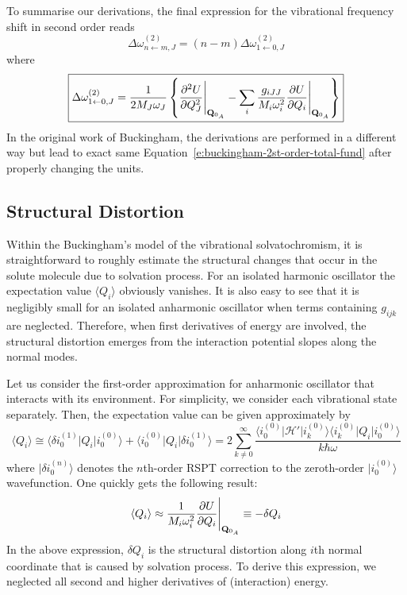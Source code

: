 \documentclass[b5paper,oneside,fleqn,11pt]{book}
\begin{document}
\begin{refsection}
To summarise our derivations, the final expression for the vibrational frequency shift in 
second order reads
%
\begin{equation}  \label{e:buckingham-2st-order-total}
\boxed{
\Delta \omega_{n\leftarrow m,J}^{(2)} = \left( n-m \right) \Delta \omega_{1\leftarrow 0,J}^{(2)}
}
\end{equation}
%
where
%
\begin{equation}  \label{e:buckingham-2st-order-total-fund}
\boxed{
\Delta \omega_{1\leftarrow 0,J}^{(2)} = 
\frac{1}{2M_J\omega_J} 
\left\{
\frac{\partial^2 U}{\partial Q_J^2} \Bigg|_{{\bf Q}_{0_A}} 
%
- \sum_{i} \frac{g_{iJJ}}{M_i\omega_i^2} 
\frac{\partial U}{\partial Q_i} \Bigg|_{{\bf Q}_{0_A}}
\right\}
}
\end{equation}
%
In the original work of Buckingham, the derivations are performed in a different way
but lead to exact same Equation~\eqref{e:buckingham-2st-order-total-fund} 
after properly changing the units.

\subsection{Structural Distortion\label{s:structural-distortion-buckingham}}

Within the Buckingham's model of the vibrational solvatochromism,
it is straightforward to roughly estimate the structural changes
that occur in the solute molecule due to solvation process.
%
For an isolated harmonic oscillator the expectation value
$\langle Q_i \rangle$ obviously
vanishes. It is also easy to see that it is negligibly small
for an isolated anharmonic oscillator when terms containing $g_{ijk}$
are neglected. Therefore, when first derivatives of energy are involved,
the structural distortion emerges from the interaction potential slopes
along the normal modes.

Let us consider the first\hyp{}order approximation for anharmonic
oscillator that interacts with its environment.
For simplicity, we consider each vibrational state separately.
Then, the expectation value can be given approximately by
%
\begin{equation} 
\langle Q_i \rangle \cong 
\langle \delta i_0^{(1)} \vert Q_i \vert i_0^{(0)} \rangle + \langle i_0^{(0)} \vert Q_i \vert \delta i_0^{(1)} \rangle
= 2\sum_{k\ne 0}^{\infty} \frac{
\langle i_0^{(0)} \vert \mathscr{H}' \vert i_k^{(0)} \rangle \langle i_k^{(0)} \vert Q_i \vert i_0^{(0)} \rangle
}{k\hbar\omega}
\end{equation}
%
where $\vert \delta i_0^{(n)} \rangle$ denotes the $n$th\hyp{}order RSPT correction 
to the zeroth\hyp{}order $\vert i_0^{(0)} \rangle$ wavefunction.
One quickly gets the following result:
%
\begin{equation}  \label{e:buckingham-struct-dist}
\langle Q_i \rangle \approx \frac{1}{M_i\omega_i^2} \frac{\partial U}{\partial Q_i} \Bigg|_{{\bf Q}_{0_A}} \equiv -\delta Q_i
\end{equation}
%
In the above expression, $\delta Q_i$ is the structural distortion
along $i$th normal coordinate that is caused by solvation process. 
To derive this expression, we neglected all second and higher derivatives
of (interaction) energy.


\end{refsection}
\end{document}
